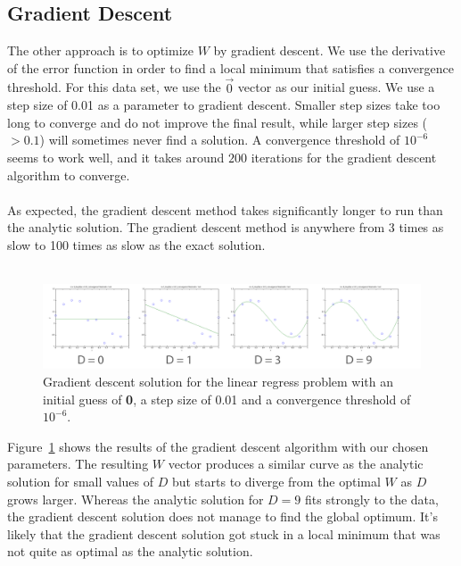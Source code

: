 \documentclass[11pt]{article}   %
\theoremstyle{plain}
\begin{document}
\subsection{Gradient Descent}
The other approach is to optimize $W$ by gradient descent. We use the derivative of the error function in order to find a local minimum that satisfies a convergence threshold. For this data set, we use the \textbf{$\overrightarrow{0}$} vector as our initial guess. We use a step size of 0.01 as a parameter to gradient descent. Smaller step sizes take too long to converge and do not improve the final result, while larger step sizes ($> 0.1$) will sometimes never find a solution. A convergence threshold of $10^{-6}$ seems to work well, and it takes around $200$ iterations for the gradient descent algorithm to converge. \\
\\
\indent As expected, the gradient descent method takes significantly longer to run than the analytic solution. The gradient descent method is anywhere from 3 times as slow to 100 times as slow as the exact solution. \\
\\
\begin{figure}[h!]\label{fig-gradient}
  \caption{Gradient descent solution for the linear regress problem with an initial guess of \textbf{0}, a step size of 0.01 and a convergence threshold of $10^{-6}$.}
  \centering
    \includegraphics[width=1.0\textwidth]{figures/problem_2_2_full.png}
\end{figure}

\indent Figure~\ref{fig-gradient} shows the results of the gradient descent algorithm with our chosen parameters. The resulting $W$ vector produces a similar curve as the analytic solution for small values of $D$ but starts to diverge from the optimal $W$ as $D$ grows larger. Whereas the analytic solution for $D=9$ fits strongly to the data, the gradient descent solution does not manage to find the global optimum. It's likely that the gradient descent solution got stuck in a local minimum that was not quite as optimal as the analytic solution.
\end{document}
